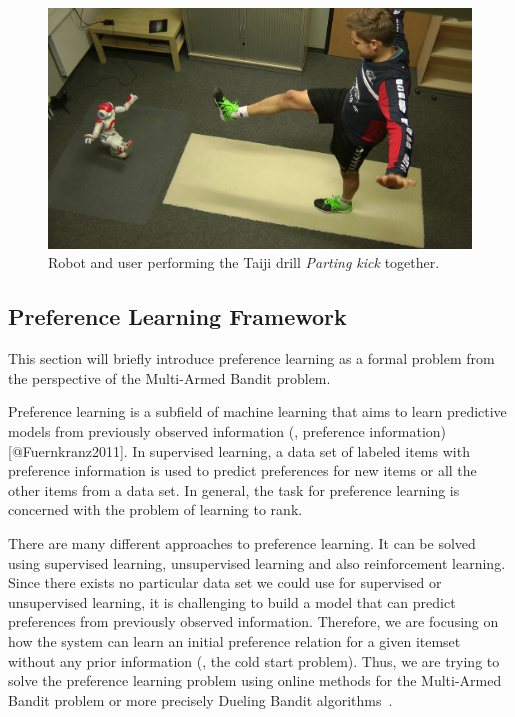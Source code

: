 \begin{figure}[h!]
\includegraphics[width=\columnwidth]{figures/taichi.png}
\caption{Robot and user performing the Taiji drill \textit{Parting kick} together.} \label{fig:exercises}
\end{figure}


\subsection{Preference Learning Framework} \label{sec:framework}

This section will briefly introduce preference learning as a formal problem from the perspective of the Multi-Armed Bandit problem.

Preference learning is a subfield of machine learning that aims to learn predictive models from previously observed information (\ie{}, preference information) [@Fuernkranz2011]. 
In supervised learning, a data set of labeled items with preference information is used to predict preferences for new items or all the other items from a data set.
In general, the task for preference learning is concerned with the problem of learning to rank.


There are many different approaches to preference learning. 
It can be solved using supervised learning, unsupervised learning and also reinforcement learning. 
Since there exists no particular data set we could use for supervised or unsupervised learning, it is challenging to build a model that can predict preferences from previously observed information. 
Therefore, we are focusing on how the system can learn an initial preference relation for a given itemset without any prior information (\ie{}, the cold start problem). 
Thus, we are trying to solve the preference learning problem using online methods for the Multi-Armed Bandit problem or more precisely Dueling Bandit algorithms~\cite{yue2012k}.


